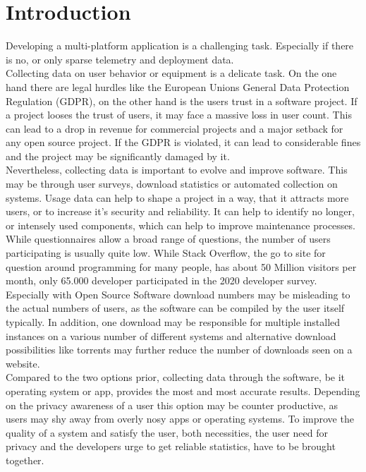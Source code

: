 \chapter{Introduction}
\label{chap:introduction}
%
Developing a multi-platform application is a challenging task. Especially if 
there is no, or only sparse telemetry and deployment data.\\

Collecting data on user behavior or equipment is a delicate task. On the one hand there are legal hurdles like the European Unions General Data Protection Regulation (GDPR), on the other hand is the users trust in a software project. If a project looses the trust of users, it may face a massive loss in user count. This can lead to a drop in revenue for commercial projects and a major setback for any open source project. If the GDPR is violated, it can lead to considerable fines and the project may be significantly damaged by it.\\

Nevertheless, collecting data is important to evolve and improve software. This may be through
user surveys, download statistics or automated collection on systems.
Usage data can help to shape a project in a way, that it attracts more users, or to increase it's security and reliability.
It can help to identify no longer, or intensely used components, which can help to improve maintenance processes.\\
While questionnaires allow a broad range of questions, the number of users participating is usually quite low. While Stack Overflow, the go to site for question around programming for many people, has about 50 Million visitors per month, only 65.000 developer participated in the 2020 developer survey\cite{noauthor_stack_nodate}.
Especially with Open Source Software download numbers may be misleading to the actual numbers of users, as the software can be compiled by the user itself typically. In addition, one download may be responsible for multiple installed instances on a various number of different systems and alternative download possibilities like torrents may further reduce the number of downloads seen on a website.\\

Compared to the two options prior, collecting data through the software, be it operating system or app, provides the most and most accurate results. Depending on the privacy awareness of a user this option may be counter productive, as users may shy away from overly nosy apps or operating systems. To improve the quality of a system and satisfy the user, both necessities, the user need for privacy and the developers urge to get reliable statistics, have to be brought together.\\

